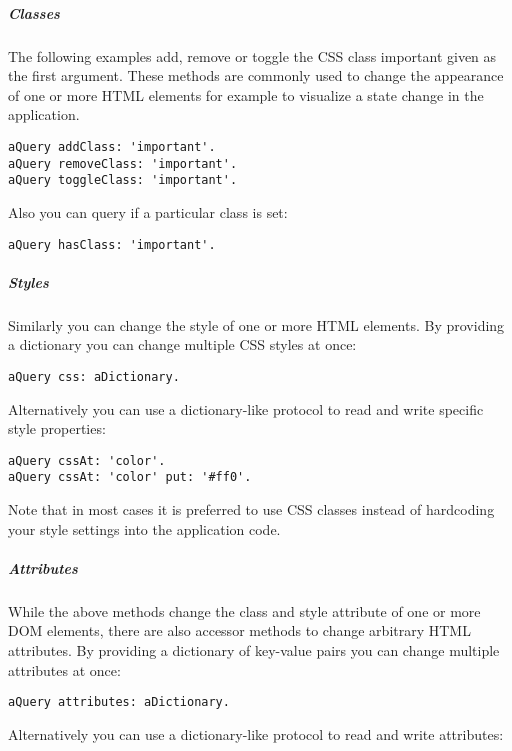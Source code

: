 \documentclass[a4paper,10pt,twoside]{book}
\newcommand{\ct}[1]{{\small\ttfamily\textup{#1}}}
\begin{document}
\subparagraph*{ Classes}
\label{book:web20:jquery:basics:performingactions:7758553}
The following examples add, remove or toggle the CSS class \ct{important} given as the first argument. These methods are commonly used to change the appearance of one or more HTML elements for example to visualize a state change in the application.

\begin{lstlisting}
aQuery addClass: 'important'.
aQuery removeClass: 'important'.
aQuery toggleClass: 'important'.
\end{lstlisting}

Also you can query if a particular class is set:

\begin{lstlisting}
aQuery hasClass: 'important'.
\end{lstlisting}

\subparagraph*{ Styles}
\label{book:web20:jquery:basics:performingactions:148771795}
Similarly you can change the style of one or more HTML elements. By providing a dictionary you can change multiple CSS styles at once:

\begin{lstlisting}
aQuery css: aDictionary.
\end{lstlisting}

Alternatively you can use a dictionary-like protocol to read and write specific style properties:

\begin{lstlisting}
aQuery cssAt: 'color'.
aQuery cssAt: 'color' put: '#ff0'.
\end{lstlisting}

Note that in most cases it is preferred to use CSS classes instead of hardcoding your style settings into the application code.

\subparagraph*{ Attributes}
\label{book:web20:jquery:basics:performingactions:216277082}
While the above methods change the \ct{class} and \ct{style} attribute of one or more DOM elements, there are also accessor methods to change arbitrary HTML attributes. By providing a dictionary of key-value pairs you can change multiple attributes at once:

\begin{lstlisting}
aQuery attributes: aDictionary.
\end{lstlisting}

Alternatively you can use a dictionary-like protocol to read and write attributes:
\end{document}
